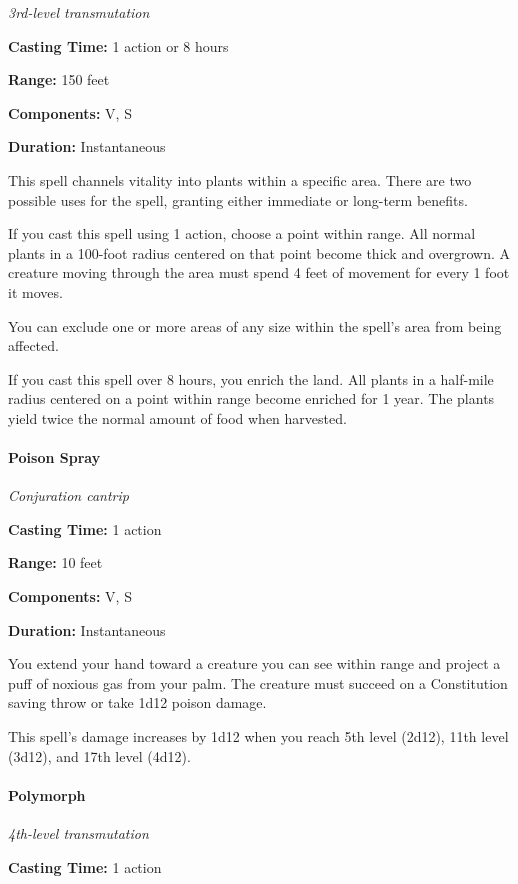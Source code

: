 \documentclass[
]{article}
\begin{document}
\emph{3rd-level transmutation}

\textbf{Casting Time:} 1 action or 8 hours

\textbf{Range:} 150 feet

\textbf{Components:} V, S

\textbf{Duration:} Instantaneous

This spell channels vitality into plants within a specific area. There
are two possible uses for the spell, granting either immediate or
long-term benefits.

If you cast this spell using 1 action, choose a point within range. All
normal plants in a 100-foot radius centered on that point become thick
and overgrown. A creature moving through the area must spend 4 feet of
movement for every 1 foot it moves.

You can exclude one or more areas of any size within the spell's area
from being affected.

If you cast this spell over 8 hours, you enrich the land. All plants in
a half-mile radius centered on a point within range become enriched for
1 year. The plants yield twice the normal amount of food when harvested.

\hypertarget{poison-spray}{%
\paragraph{Poison Spray}\label{poison-spray}}

\emph{Conjuration cantrip}

\textbf{Casting Time:} 1 action

\textbf{Range:} 10 feet

\textbf{Components:} V, S

\textbf{Duration:} Instantaneous

You extend your hand toward a creature you can see within range and
project a puff of noxious gas from your palm. The creature must succeed
on a Constitution saving throw or take 1d12 poison damage.

This spell's damage increases by 1d12 when you reach 5th level (2d12),
11th level (3d12), and 17th level (4d12).

\hypertarget{polymorph}{%
\paragraph{Polymorph}\label{polymorph}}

\emph{4th-level transmutation}

\textbf{Casting Time:} 1 action
\end{document}
